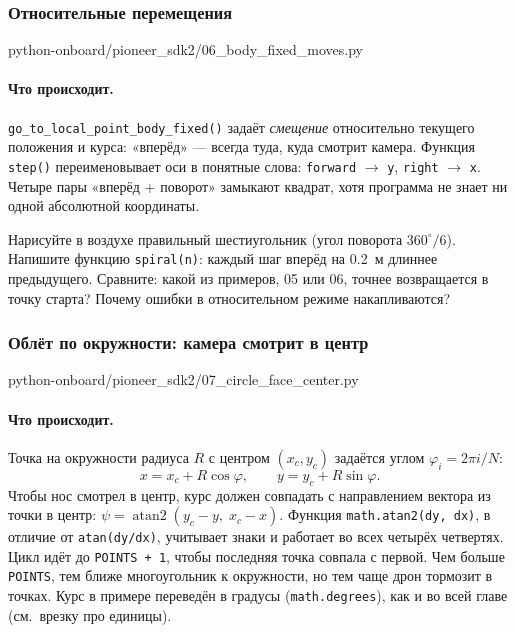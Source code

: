 \subsubsection*{Относительные перемещения}

\begin{codefile}[python]{python-onboard/pioneer_sdk2/06_body_fixed_moves.py}
\end{codefile}

\paragraph{Что происходит.} \verb|go_to_local_point_body_fixed()| задаёт \emph{смещение} относительно текущего положения и курса: «вперёд» --- всегда туда, куда смотрит камера. Функция \verb|step()| переименовывает оси в понятные слова: \verb|forward| $\to$ \verb|y|, \verb|right| $\to$ \verb|x|. Четыре пары «вперёд + поворот» замыкают квадрат, хотя программа не знает ни одной абсолютной координаты.

\begin{taskbox}
Нарисуйте в воздухе правильный шестиугольник (угол поворота $360^\circ/6$). Напишите функцию \verb|spiral(n)|: каждый шаг вперёд на 0.2~м длиннее предыдущего. Сравните: какой из примеров, 05 или 06, точнее возвращается в точку старта? Почему ошибки в относительном режиме накапливаются?
\end{taskbox}

\subsubsection*{Облёт по окружности: камера смотрит в центр}

\begin{codefile}[python]{python-onboard/pioneer_sdk2/07_circle_face_center.py}
\end{codefile}

\paragraph{Что происходит.} Точка на окружности радиуса $R$ с центром $(x_c, y_c)$ задаётся углом $\varphi_i = 2\pi i/N$:
\[
x = x_c + R\cos\varphi,\qquad y = y_c + R\sin\varphi.
\]
Чтобы нос смотрел в центр, курс должен совпадать с направлением вектора из точки в центр: $\psi = \operatorname{atan2}(y_c - y,\; x_c - x)$. Функция \verb|math.atan2(dy, dx)|, в отличие от \verb|atan(dy/dx)|, учитывает знаки и работает во всех четырёх четвертях. Цикл идёт до \verb|POINTS + 1|, чтобы последняя точка совпала с первой. Чем больше \verb|POINTS|, тем ближе многоугольник к окружности, но тем чаще дрон тормозит в точках. Курс в примере переведён в градусы (\verb|math.degrees|), как и во всей главе (см.\ врезку про единицы).

